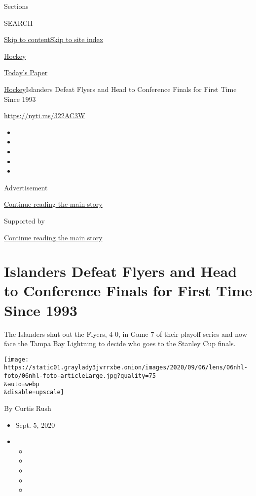 Sections

SEARCH

\protect\hyperlink{site-content}{Skip to
content}\protect\hyperlink{site-index}{Skip to site index}

\href{https://www.nytimes3xbfgragh.onion/section/sports/hockey}{Hockey}

\href{https://myaccount.nytimes3xbfgragh.onion/auth/login?response_type=cookie\&client_id=vi}{}

\href{https://www.nytimes3xbfgragh.onion/section/todayspaper}{Today's
Paper}

\href{/section/sports/hockey}{Hockey}\textbar{}Islanders Defeat Flyers
and Head to Conference Finals for First Time Since 1993

\url{https://nyti.ms/322AC3W}

\begin{itemize}
\item
\item
\item
\item
\item
\end{itemize}

Advertisement

\protect\hyperlink{after-top}{Continue reading the main story}

Supported by

\protect\hyperlink{after-sponsor}{Continue reading the main story}

\hypertarget{islanders-defeat-flyers-and-head-to-conference-finals-for-first-time-since-1993}{%
\section{Islanders Defeat Flyers and Head to Conference Finals for First
Time Since
1993}\label{islanders-defeat-flyers-and-head-to-conference-finals-for-first-time-since-1993}}

The Islanders shut out the Flyers, 4-0, in Game 7 of their playoff
series and now face the Tampa Bay Lightning to decide who goes to the
Stanley Cup finals.

\texttt{[image: https://static01.graylady3jvrrxbe.onion/images/2020/09/06/lens/06nhl-foto/06nhl-foto-articleLarge.jpg?quality=75\\\&auto=webp\\\&disable=upscale]}

By Curtis Rush

\begin{itemize}
\item
  Sept. 5, 2020
\item
  \begin{itemize}
  \item
  \item
  \item
  \item
  \item
  \end{itemize}
\end{itemize}

